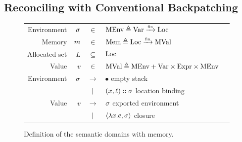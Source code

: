 \subsection{Reconciling with Conventional Backpatching}
\begin{figure}[h!]
  \centering
  \small
  \begin{tabular}{rrcll}
    Environment   & $\sigma$ & $\in$         & $\text{MEnv}\triangleq{\text{Var}}\xrightarrow{\mbox{\tiny{fin}}}{\text{Loc}}$                            \\
    Memory        & $m$ & $\in$         & $\text{Mem}\triangleq{\text{Loc}}\xrightarrow{\mbox{\tiny{fin}}}{\text{MVal}}$                              \\
    Allocated set & $L$    & $\subseteq$   & $\text{Loc}$                                                          \\
    Value         & $v$    & $\in$         & $\text{MVal} \triangleq\text{MEnv}+\text{Var}\times\text{Expr}\times\text{MEnv}$           \\
    Environment   & $\sigma$ & $\rightarrow$ & $\bullet$                           \hfill empty stack          \\
                  &        & $|$       & $(x,\ell)::\sigma$                 \hfill location binding     \\
    Value         & $v$    & $\rightarrow$ & $\sigma$                              \hfill exported environment \\
                  &        & $|$       & $\langle \lambda x.e, \sigma \rangle$ \hfill closure
  \end{tabular}
  \caption{Definition of the semantic domains with memory.}
  \label{fig:memdomain}
\end{figure}

